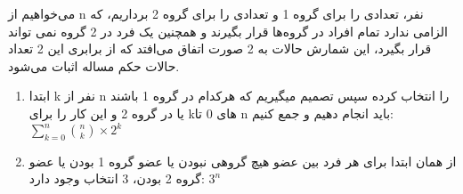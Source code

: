 \p
    می‌خواهیم از n نفر، تعدادی را برای گروه 1 و تعدادی را برای گروه 2 برداریم، که الزامی ندارد تمام افراد در گروه‌ها قرار بگیرند و همچنین یک فرد در 2 گروه نمی تواند قرار بگیرد، این شمارش حالات به 2 صورت اتفاق می‌افتد که از برابری این 2 تعداد حالات حکم مساله اثبات می‌شود.
    \begin{enumerate}
        \item 
        ابتدا k نفر از n را انتخاب کرده سپس تصمیم میگیریم که هرکدام در گروه 1 باشند یا در گروه 2 و این کار را برای k‌های 0 تا n باید انجام دهیم و جمع کنیم:
        \(\displaystyle\sum_{k=0}^{n} {\binom{n}{k}\times2^k}\)
        \item
        از همان ابتدا برای هر فرد بین عضو هیچ گروهی نبودن یا عضو گروه 1 بودن یا عضو گروه 2 بودن، 3 انتخاب وجود دارد:
        \(3^n\)
    \end{enumerate}